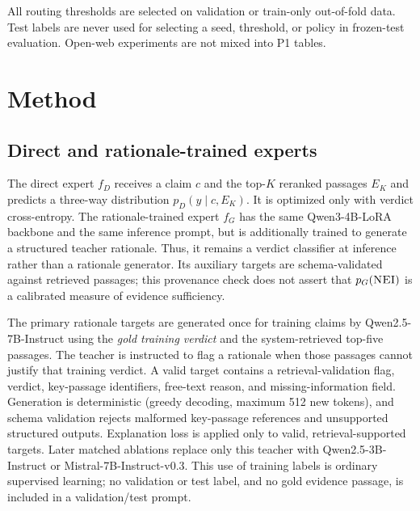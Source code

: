 \documentclass[11pt]{article}
\begin{document}
All routing thresholds are selected on validation or train-only out-of-fold data. Test labels are never used for selecting a seed, threshold, or policy in frozen-test evaluation. Open-web experiments are not mixed into P1 tables.

\section{Method}
\subsection{Direct and rationale-trained experts}
The direct expert $f_D$ receives a claim $c$ and the top-$K$ reranked passages $E_K$ and predicts a three-way distribution $p_D(y\mid c,E_K)$. It is optimized only with verdict cross-entropy. The rationale-trained expert $f_G$ has the same Qwen3-4B-LoRA backbone and the same inference prompt, but is additionally trained to generate a structured teacher rationale. Thus, it remains a verdict classifier at inference rather than a rationale generator. Its auxiliary targets are schema-validated against retrieved passages; this provenance check does not assert that $p_G(\textsc{NEI})$ is a calibrated measure of evidence sufficiency.

The primary rationale targets are generated once for training claims by Qwen2.5-7B-Instruct using the \emph{gold training verdict} and the system-retrieved top-five passages. The teacher is instructed to flag a rationale when those passages cannot justify that training verdict. A valid target contains a retrieval-validation flag, verdict, key-passage identifiers, free-text reason, and missing-information field. Generation is deterministic (greedy decoding, maximum 512 new tokens), and schema validation rejects malformed key-passage references and unsupported structured outputs. Explanation loss is applied only to valid, retrieval-supported targets. Later matched ablations replace only this teacher with Qwen2.5-3B-Instruct or Mistral-7B-Instruct-v0.3. This use of training labels is ordinary supervised learning; no validation or test label, and no gold evidence passage, is included in a validation/test prompt.
\end{document}
